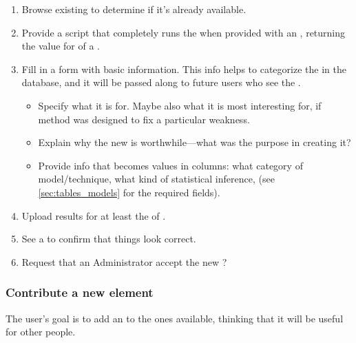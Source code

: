 \begin{enumerate}
    \item Browse existing \Methods to determine if it's already available.
    \item Provide a script that completely runs the \Method when provided with an \Element, returning the value for \Performance of a \Task.
    \item Fill in a form with basic information.
          This info helps to categorize the \Method in the database, and it will be passed along to future users who see the \Method.
        \begin{itemize}
            \item Specify what \Task it is for.
                  Maybe also what \Refset it is most interesting for, \eg if method was designed to fix a particular weakness.
            \item Explain why the new \Method is worthwhile---what was the purpose in creating it?
            \item Provide info that becomes values in columns: what category of model/technique, what kind of statistical inference, \etc (see \cref{sec:tables_models} for the required fields).
        \end{itemize}
    \item Upload \Performance results for at least the \Benchmark of \Elements.
    \item See a \Report to confirm that things look correct.
    \item Request that an Administrator accept the new \Method?
\end{enumerate}

\subsubsection{Contribute a new element}

The user's goal is to add an \Element to the ones available, thinking that it will be useful for other people.

